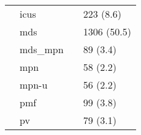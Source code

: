 \begin{tabular}{llll}
                 & icus &        &         223 (8.6) \\
                 & mds &        &       1306 (50.5) \\
                 & mds\_mpn &        &          89 (3.4) \\
                 & mpn &        &          58 (2.2) \\
                 & mpn-u &        &          56 (2.2) \\
                 & pmf &        &          99 (3.8) \\
                 & pv &        &          79 (3.1) \\
\bottomrule
\end{tabular}
